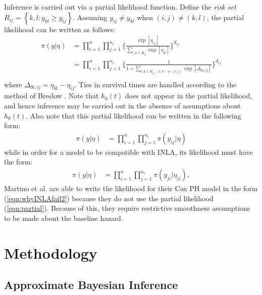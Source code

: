 \documentclass[AMA,STIX1COL,doublespace]{WileyNJD-v2}
\begin{document}
Inference is carried out via a partial likelihood function. Define the \textit{risk set} $R_{ij} = \left\{k,l : y_{kl} \geq y_{ij}\right\}$. Assuming $y_{ij} \neq y_{kl}$ when $(i,j) \neq (k,l)$, the partial likelihood can be written as follows: 
\begin{equation}\begin{aligned}\label{eqn:partial}
\pi(y|\eta) &= \prod_{i=1}^{n}\prod_{j=1}^{n_{i}} \bigg\{\frac{\exp[\eta_{ij}]}{{\sum_{l,k\in R_{ij}}^{}\exp[\eta_{lk}]}}\bigg \}^{d_{ij}} \\
&= \prod_{i=1}^{n}\prod_{j=1}^{n_{i}} \bigg\{\frac{1}{{1 + \sum_{l,k\in R_{ij} , (l,k) \neq (i,j)}\exp[\Delta_{lk,ij}]}}\bigg \}^{d_{ij}} \\
\end{aligned}\end{equation}
where $\Delta_{lk,ij} = \eta_{lk} - \eta_{ij}$. Ties in survival times are handled according to the method of Breslow \cite{Breslow}. Note that $h_{0}(t)$ does not appear in the partial likelihood, and hence inference may be carried out in the absence of assumptions about $h_{0}(t)$. Also note that this partial likelihood can be written in the following form:
\begin{equation}\begin{aligned}\label{eqn:whyINLAfail1}
\pi(y|\eta) &= \prod_{i=1}^{n}\prod_{j=1}^{n_{i}} \pi(y_{ij}|\eta)
\end{aligned}\end{equation}
while in order for a model to be compatible with INLA, its likelihood must have the form:
\begin{equation}\begin{aligned}\label{eqn:whyINLAfail2}
\pi(y|\eta) &= \prod_{i=1}^{n}\prod_{j=1}^{n_{i}} \pi(y_{ji}|\eta_{ij}),
\end{aligned}\end{equation}
Martino et al. \cite{inlacoxph} are able to write the likelihood for their Cox PH model in the form (\ref{eqn:whyINLAfail2}) because they do not use the partial likelihood (\ref{eqn:partial}). Because of this, they require restrictive smoothness assumptions to be made about the baseline hazard.


\section{Methodology}\label{sec:method}

\subsection{Approximate Bayesian Inference}
\end{document}
